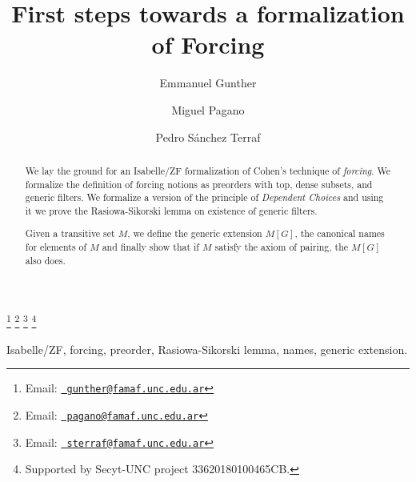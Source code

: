 \documentclass[9pt]{entcs} \usepackage{entcsmacro}
\begin{document}
\begin{frontmatter}
  \title{First steps towards a formalization of Forcing}
  \author{Emmanuel Gunther%
    }
  \address{FaMAF\\ Universidad Nacional de C\'ordoba\\
    C\'ordoba, Argentina} \author{Miguel Pagano}
  \address{FaMAF\\Universidad Nacional de C\'ordoba\\
    C\'ordoba, Argentina}
  \author{Pedro S\'anchez Terraf}
  \address{CIEM-FaMAF\\Universidad Nacional de C\'ordoba\\
    C\'ordoba, Argentina}
 \thanks[myemail]{Email:
    \href{mailto:gunther@famaf.unc.edu.ar} {\texttt{\normalshape
        gunther@famaf.unc.edu.ar}}} \thanks[coemail]{Email:
    \href{mailto:pagano@famaf.unc.edu.ar} {\texttt{\normalshape
        pagano@famaf.unc.edu.ar}}}  \thanks[co2email]{Email:
    \href{mailto:sterraf@famaf.unc.edu.ar} {\texttt{\normalshape
        sterraf@famaf.unc.edu.ar}}} 
 \thanks[ALL]{Supported by Secyt-UNC project 33620180100465CB.} 
\begin{abstract} 
  We lay the ground for an Isabelle/ZF formalization of Cohen's technique of
  \emph{forcing}. We formalize the definition of forcing notions as
  preorders with top, dense subsets, and generic filters. We formalize
  a version of the principle of \emph{Dependent Choices} and using it
  we prove the Rasiowa-Sikorski lemma on existence of generic filters.
  
  Given a transitive set $M$, we define the generic extension $M[G]$,
  the canonical names for elements of $M$ and finally show that if $M$
  satisfy the axiom of pairing, the $M[G]$ also does.
\end{abstract}
\begin{keyword}
Isabelle/ZF, forcing, preorder, Rasiowa-Sikorski lemma, names, generic extension.
\end{keyword}
\end{frontmatter}






















\end{document}

